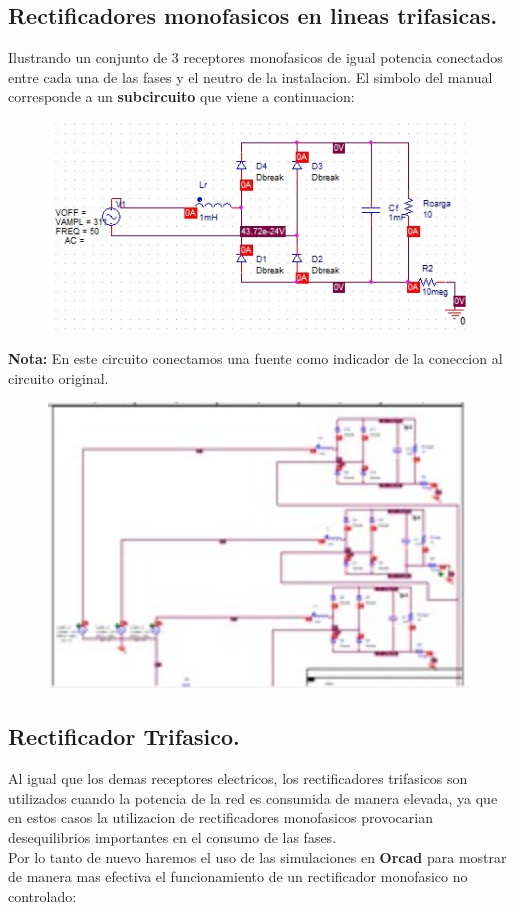 \documentclass[11pt,a4paper]{article}
\begin{document}
\subsection{Rectificadores monofasicos en lineas trifasicas.}
Ilustrando un conjunto de 3 receptores monofasicos de igual potencia conectados entre cada una de las fases y el neutro de la instalacion. El simbolo del manual corresponde a un \textbf{subcircuito} que viene a continuacion:

\begin{figure}[h]
\centering
\includegraphics[scale=.5]{11.png} 
\end{figure}
 
\textbf{Nota:} En este circuito conectamos una fuente como indicador de la coneccion al circuito original.

\begin{figure}[h]
\centering
\includegraphics[scale=.5]{12.png} 
\end{figure}

\subsection{Rectificador Trifasico.}
Al igual que los demas receptores electricos, los rectificadores trifasicos  son utilizados cuando la potencia de la red es consumida de manera elevada, ya que en estos casos la utilizacion de rectificadores monofasicos provocarian desequilibrios importantes en el consumo de las fases.\\
Por lo tanto de nuevo haremos el uso de las simulaciones en \textbf{Orcad} para mostrar de manera mas efectiva el funcionamiento de un rectificador monofasico no controlado:
\end{document}

